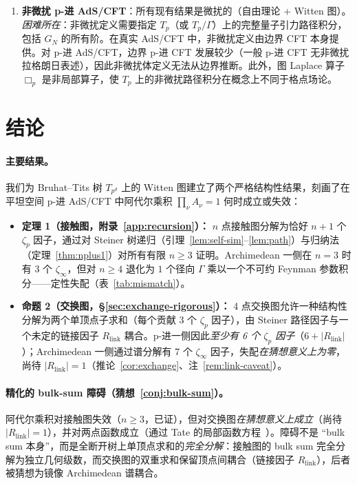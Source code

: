 \documentclass[11pt,a4paper]{ctexart}
\theoremstyle{remark}
\newcommand{\Tp}{T_p}
\newcommand{\Boxp}{\Box_p}
\newcommand{\BirTits}{Bruhat--Tits}
\begin{document}
\begin{enumerate}[leftmargin=2em]
    \item \textbf{非微扰 p-进 AdS/CFT}：所有现有结果是微扰的（自由理论 + Witten 图）。\textit{困难所在}：非微扰定义需要指定 $\Tp$（或 $\Tp/\Gamma$）上的完整量子引力路径积分，包括 $G_N$ 的所有阶。在真实 AdS/CFT 中，非微扰定义由边界 CFT 本身提供。对 p-进 AdS/CFT，边界 p-进 CFT 发展较少（一般 p-进 CFT 无非微扰拉格朗日表述），因此非微扰体定义无法从边界推断。此外，图 Laplace 算子 $\Boxp$ 是非局部算子，使 $\Tp$ 上的非微扰路径积分在概念上不同于格点场论。
\end{enumerate}

\section{结论}
\label{sec:conclusion}

\paragraph{主要结果。}
我们为 \BirTits{} 树 $T_{p^d}$ 上的 Witten 图建立了两个严格结构性结果，刻画了在平坦空间 p-进 AdS/CFT 中阿代尔乘积 $\prod_\nu A_\nu = 1$ 何时成立或失效：

\begin{itemize}[leftmargin=2em]
    \item \textbf{定理 1（接触图，附录~\ref{app:recursion}）：} $n$ 点接触图分解为恰好 $n{+}1$ 个 $\zeta_p$ 因子，通过对 Steiner 树递归（引理~\ref{lem:self-sim}--\ref{lem:path}）与归纳法（定理~\ref{thm:nplus1}）对所有有限 $n \geq 3$ 证明。Archimedean 一侧在 $n=3$ 时有 3 个 $\zeta_\infty$，但对 $n \geq 4$ 退化为 $1$ 个径向 $\Gamma$ 乘以一个不可约 Feynman 参数积分——定性失配（表~\ref{tab:mismatch}）。
    \item \textbf{命题 2（交换图，\S\ref{sec:exchange-rigorous}）：} 4 点交换图允许一种结构性分解为两个单顶点子求和（每个贡献 3 个 $\zeta_p$ 因子），由 Steiner 路径因子与一个未定的链接因子 $R_{\mathrm{link}}$ 耦合。p-进一侧因此\emph{至少有 6 个 $\zeta_p$ 因子}（$6 + |R_{\mathrm{link}}|$）；Archimedean 一侧通过谱分解有 7 个 $\zeta_\infty$ 因子，失配\emph{在猜想意义上为零}，尚待 $|R_{\mathrm{link}}| = 1$（推论~\ref{cor:exchange}、注~\ref{rem:link-caveat}）。
\end{itemize}

\paragraph{精化的 bulk-sum 障碍（猜想~\ref{conj:bulk-sum}）。}
阿代尔乘积对接触图失效（$n \geq 3$，已证），但对交换图\emph{在猜想意义上成立}（尚待 $|R_{\mathrm{link}}| = 1$），并对两点函数成立（通过 Tate 的局部函数方程~\cite{HSYZ20}）。障碍不是 ``bulk sum 本身''，而是全断开树上单顶点求和的\emph{完全分解}：接触图的 bulk sum 完全分解为独立几何级数，而交换图的双重求和保留顶点间耦合（链接因子 $R_{\mathrm{link}}$），后者被猜想为镜像 Archimedean 谱耦合。
\end{document}
